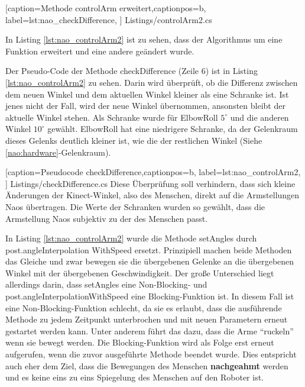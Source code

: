 
    [caption={Methode \textsf{controlArm erweitert}},captionpos=b,
       label=lst:nao_checkDifference,
       ]	
 {Listings/controlArm2.cs}

In Listing \ref{lst:nao_controlArm2} ist zu sehen, dass der Algorithmus um eine Funktion erweitert und eine andere geändert wurde.

Der Pseudo-Code der Methode \textsf{checkDifference} (Zeile 6) ist in Listing \ref{lst:nao_controlArm2} zu sehen. Darin wird überprüft, ob die Differenz zwischen dem neuen Winkel und dem aktuellen Winkel kleiner als eine Schranke ist. Ist jenes nicht der Fall, wird der neue Winkel übernommen, ansonsten bleibt der aktuelle Winkel stehen. 
Als Schranke wurde für ElbowRoll $5^\circ$ und die anderen Winkel $10^\circ$ gewählt. ElbowRoll hat eine niedrigere Schranke, da der Gelenkraum dieses Gelenks deutlich kleiner ist, wie die der restlichen Winkel (Siehe \ref{nao:hardware}-Gelenkraum). 

    [caption={Pseudocode \textsf{checkDifference}},captionpos=b,
       label=lst:nao_controlArm2,
       ]	
 {Listings/checkDifference.cs}
Diese Überprüfung soll verhindern, dass sich kleine Änderungen der Kinect-Winkel, also des Menschen, direkt auf die Armstellungen Naos übertragen. Die Werte der Schranken wurden so gewählt, dass die Armstellung Naos subjektiv zu der des Menschen passt.


In Listing \ref{lst:nao_controlArm2} wurde die Methode \textsf{setAngles} durch \textsf{post.angleInterpolation
WithSpeed} ersetzt. Prinzipiell machen beide Methoden das Gleiche und zwar bewegen sie die übergebenen Gelenke an die übergebenen Winkel mit der übergebenen Geschwindigkeit. Der große Unterschied liegt allerdings darin, dass \textsf{setAngles} eine Non-Blocking- und \textsf{post.angleInterpolationWithSpeed} eine Blocking-Funktion ist. In diesem Fall ist eine Non-Blocking-Funktion schlecht, da sie es erlaubt, dass die ausführende Methode zu jedem Zeitpunkt unterbrochen  und mit neuen Parametern erneut gestartet werden kann. Unter anderem führt das dazu, dass die Arme "`ruckeln"' wenn sie bewegt werden. Die Blocking-Funktion wird als Folge erst erneut aufgerufen, wenn die zuvor ausgeführte Methode beendet wurde. Dies entspricht auch eher dem Ziel, dass die Bewegungen des Menschen \textbf{nachgeahmt} werden und es keine eins zu eins Spiegelung des Menschen auf den Roboter ist.

 
